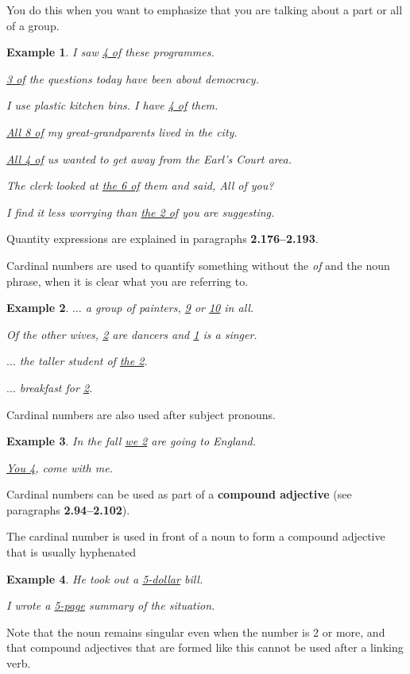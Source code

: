 \documentclass[oneside]{book}
\numberwithin{equation}{section}
\newtheorem{example}{Example}[section]
\begin{document}
You do this when you want to emphasize that you are talking about a part or all of a group.
\begin{example}
    I saw \underline{4 of} these programmes.
    
    \underline{3 of} the questions today have been about democracy.
    
    I use plastic kitchen bins. I have \underline{4 of} them.
    
    \underline{All 8 of} my great-grandparents lived in the city.
    
    \underline{All 4 of} us wanted to get away from the Earl's Court area.
    
    The clerk looked at \underline{the 6 of} them and said, All of you?
    
    I find it less worrying than \underline{the 2 of} you are suggesting.
\end{example}
Quantity expressions are explained in paragraphs \textbf{2.176--2.193}.

%
\noindent{} Cardinal numbers are used to quantify something without the \textit{of} and the noun phrase, when it is clear what you are referring to.
\begin{example}
    $\ldots$ a group of painters, \underline{9} or \underline{10} in all.
    
    Of the other wives, \underline{2} are dancers and \underline{1} is a singer.
    
    $\ldots$ the taller student of \underline{the 2}.
    
    $\ldots$ breakfast for \underline{2}.
\end{example}
%
\noindent{} Cardinal numbers are also used after subject pronouns.
\begin{example}
    In the fall \underline{we 2} are going to England.
    
    \underline{You 4}, come with me.
\end{example}
%
\noindent{} Cardinal numbers can be used as part of a \textbf{compound adjective} (see paragraphs \textbf{2.94--2.102}).

The cardinal number is used in front of a noun to form a compound adjective that is usually hyphenated
\begin{example}
    He took out a \underline{5-dollar} bill.
    
    I wrote a \underline{5-page} summary of the situation.
\end{example}
Note that the noun remains singular even when the number is 2 or more, and that compound adjectives that are formed like this cannot be used after a linking verb.
\end{document}
